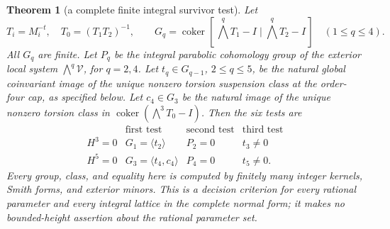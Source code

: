 \documentclass[11pt,a4paper]{article}
\newtheorem{theorem}{Theorem}[section]
\theoremstyle{definition}
\begin{document}
\begin{theorem}[a complete finite integral survivor test]
Let
\[
 T_i=M_i^{-t},\quad T_0=(T_1T_2)^{-1},\qquad
 G_q=\operatorname{coker}
 [\,\bigwedge^qT_1-I\mid\bigwedge^qT_2-I\,]
 \quad(1\le q\le4).
 \tag{F.HC2}\label{maps:eq:F.HC2}
\]
All $G_q$ are finite.  Let $P_q$ be the integral parabolic
cohomology group of the exterior local system
$\bigwedge^q\mathcal V$, for $q=2,4$.
Let $t_q\in G_{q-1}$, $2\le q\le5$, be the natural global
coinvariant image of the unique nonzero torsion suspension
class at the order-four cap, as specified below.
Let $c_4\in G_3$ be the natural image of the unique nonzero
torsion class in
$\operatorname{coker}(\bigwedge^3T_0-I)$.
Then the six tests are
\[
\begin{array}{c|ccc}
 &\text{first test}&\text{second test}&\text{third test}\\ \hline
 H^3=0&G_1=\langle t_2\rangle&P_2=0&t_3\ne0\\
 H^5=0&G_3=\langle t_4,c_4\rangle&P_4=0&t_5\ne0 .
\end{array}
\tag{F.HC3}\label{maps:eq:F.HC3}
\]
Every group, class, and equality here is computed by
finitely many integer kernels, Smith forms, and exterior
minors.  This is a decision criterion for every rational
parameter and every integral lattice in the complete
normal form; it makes no bounded-height assertion about
the rational parameter set.

\end{theorem}
\end{document}
